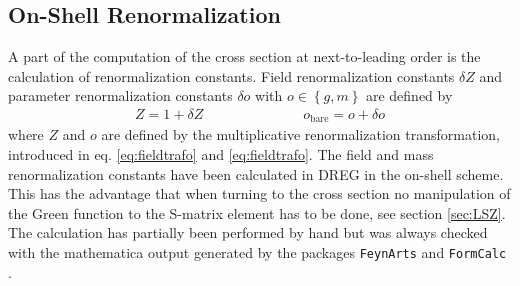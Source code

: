 \subsection{On-Shell Renormalization}\label{sec:QuarkSE}
A part of the computation of the cross section at next-to-leading order is the calculation of renormalization constants. 
Field renormalization constants $\delta Z$ and parameter renormalization constants $\delta o$ with $o \in \left\{ g, m \right\}$ are defined by
\begin{align}
Z = 1 + \delta Z \hspace{3cm} o_{\mathrm{bare}} = o + \delta o
\end{align}
where $Z$ and $o$ are defined by the multiplicative renormalization transformation, introduced in eq. \ref{eq:fieldtrafo} and \ref{eq:fieldtrafo}. The field and mass renormalization constants have been calculated in DREG in the on-shell scheme. This has the advantage that when turning to the cross section no manipulation of the Green function to the S-matrix element has to be done, see section \ref{sec:LSZ}.\\
The calculation has partially been performed by hand but was always checked with the mathematica output generated by the packages  \texttt{FeynArts} \cite{Hahn:2000} and \texttt{FormCalc} \cite{ChokoufeNejad:2013qja, Hahn:1998yk}.

